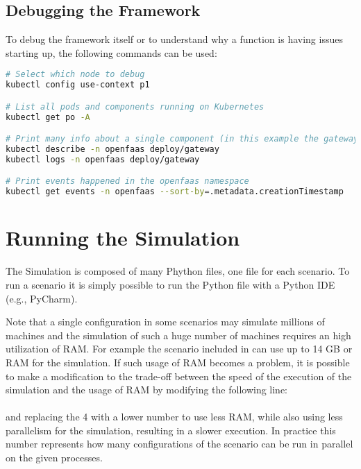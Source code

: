 \subsection{Debugging the Framework}
To debug the framework itself or to understand why a function is having issues starting up, the following commands can be used:
\begin{lstlisting}[language=bash]
# Select which node to debug
kubectl config use-context p1

# List all pods and components running on Kubernetes
kubectl get po -A

# Print many info about a single component (in this example the gateway component)
kubectl describe -n openfaas deploy/gateway
kubectl logs -n openfaas deploy/gateway

# Print events happened in the openfaas namespace
kubectl get events -n openfaas --sort-by=.metadata.creationTimestamp
\end{lstlisting}


\section{Running the Simulation}
The Simulation is composed of many Phython files, one file for each scenario. To run a scenario it is simply possible to run the Python file with a Python IDE (e.g., PyCharm).

Note that a single configuration in some scenarios may simulate millions of machines and the simulation of such a huge number of machines requires an high utilization of RAM. For example the scenario included in  can use up to 14 GB or RAM for the simulation.
If such usage of RAM becomes a problem, it is possible to make a modification to the trade-off between the speed of the execution of the simulation and the usage of RAM by modifying the following line:\\
\\
and replacing the 4 with a lower number to use less RAM, while also using less parallelism for the simulation, resulting in a slower execution. In practice this number represents how many configurations of the scenario can be run in parallel on the given processes.


